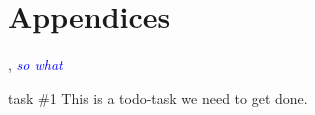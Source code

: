 \documentclass[BSP,english,oneside]{classes/gucthesis}
\newcommand{\comment}[1]{\textcolor{blue}{\emph{#1}}}
\newcommand{\todo}[1]{{\color{green}#1}}
\begin{document}



\printnoidxglossary[sort=word]


\part{Appendices}

\appendix %







\GUC, 
\comment{so what}

\todo{task \#1}
This is a todo-task we need to get done.
\end{document}
